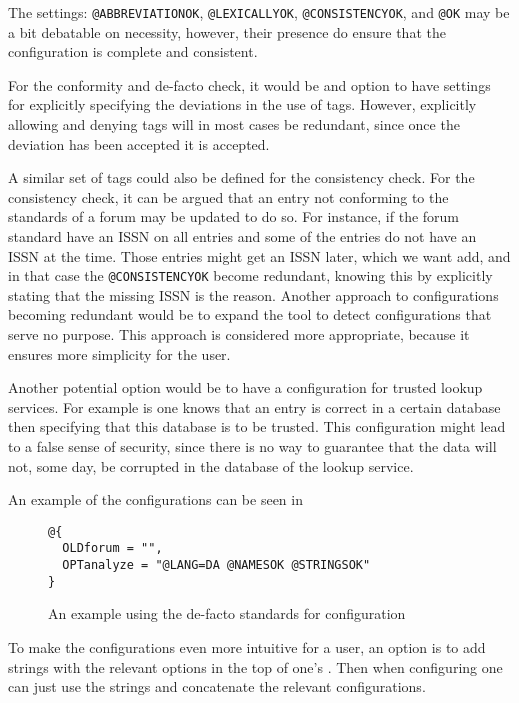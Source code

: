 The settings: \texttt{@ABBREVIATIONOK}, \texttt{@LEXICALLYOK},
\texttt{@CONSISTENCYOK}, and \texttt{@OK} may be a bit debatable on
necessity, however, their presence do ensure that the configuration is
complete and consistent.

For the conformity and de-facto check, it would be and option to have
settings for explicitly specifying the deviations in the use of tags.
However, explicitly allowing and denying tags will in most cases be
redundant, since once the deviation has been accepted it is accepted.

A similar set of tags could also be defined for the consistency check.
For the consistency check, it can be argued that an entry not
conforming to the standards of a forum may be updated to do so.  For
instance, if the forum standard have an ISSN on all entries and some
of the entries do not have an ISSN at the time.  Those entries might
get an ISSN later, which we want add, and in that case the
\texttt{@CONSISTENCYOK} become redundant, knowing this by explicitly stating
that the missing ISSN is the reason.  Another approach to
configurations becoming redundant would be to expand the tool to
detect configurations that serve no purpose.  This approach is
considered more appropriate, because it ensures more simplicity for
the user.

Another potential option would be to have a configuration for trusted
lookup services.  For example is one knows that an entry is correct in
a certain database then specifying that this database is to be
trusted.  This configuration might lead to a false sense of security,
since there is no way to guarantee that the data will not, some day,
be corrupted in the database of the lookup service.

An example of the configurations can be seen in

\begin{figure}
  \centering
\begin{verbatim}
@{
  OLDforum = "",
  OPTanalyze = "@LANG=DA @NAMESOK @STRINGSOK"
}
\end{verbatim}
  \caption{An example using the de-facto standards for configuration}
  \label{fig:analyzing_added_de_facto_standards}
\end{figure}

To make the configurations even more intuitive for a {\bibtex} user,
an option is to add {\bibtex} strings with the relevant options in the
top of one's .  Then when configuring one can just use the
{\bibtex} strings and concatenate the relevant configurations.


